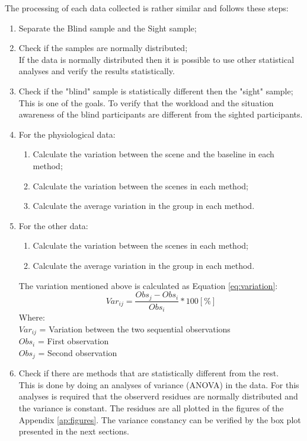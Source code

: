 The processing of each data collected is rather similar and follows these steps:
\begin{enumerate}
    \item Separate the Blind sample and the Sight sample;
    \item Check if the samples are normally distributed; \label{itm:results_shapiro} \\
        If the data is normally distributed then it is possible to use other statistical analyses and verify the results statistically.
    \item Check if the "blind" sample is statistically different then the "sight" sample; \label{itm:results_t_test} \\ 
        This is one of the goals. To verify that the workload and the situation awareness of the blind participants are different from the sighted participants.
    \item For the physiological data:
    \begin{enumerate}
        \item Calculate the variation between the scene and the baseline  in each method;
        \item Calculate the variation between the scenes in each method;
        \item Calculate the average variation in the group in each method.
    \end{enumerate}
    \item For the other data:
    \begin{enumerate}
        \item Calculate the variation between the scenes in each method; \label{itm:results_average_method_particpant}
        \item Calculate the average variation in the group in each method.
        \label{itm:results_average_method}
    \end{enumerate}
        The variation mentioned above is calculated as Equation \ref{eq:variation}:
    \begin{equation}
        \label{eq:variation}
        Var_{ij} = \frac{Obs_j - Obs_i}{Obs_i}*100 [\%]
    \end{equation}
        Where:\\
        $Var_{ij}$ = Variation between the two sequential observations \\
        $Obs_i$ = First observation \\
        $Obs_j$ = Second observation 
    
    \item Check if there are methods that are statistically different from the rest. \\
        This is done by doing an analyses of variance (ANOVA) in the data. For this analyses is required that the observerd residues are normally distributed and the variance is constant. The residues are all plotted in the figures of the Appendix \ref{ap:figures}. The variance constancy can be verified by the box plot presented in the next sections.

\end{enumerate}

